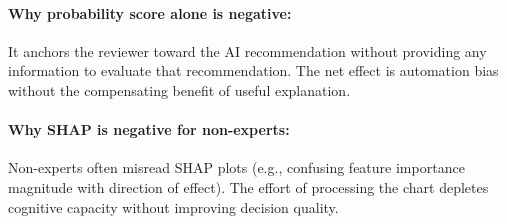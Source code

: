 \paragraph{Why probability score alone is negative:} It anchors the reviewer toward the AI recommendation without providing any information to evaluate that recommendation. The net effect is automation bias without the compensating benefit of useful explanation.

\paragraph{Why SHAP is negative for non-experts:} Non-experts often misread SHAP plots (e.g., confusing feature importance magnitude with direction of effect). The effort of processing the chart depletes cognitive capacity without improving decision quality.
